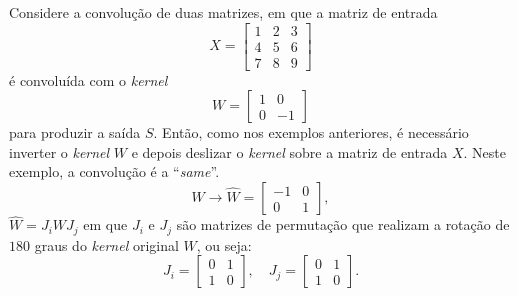 \begin{exemplo}
    \label{ex:conv2d}
    Considere a convolução de duas matrizes, em que a matriz de entrada 
    $$
    X = \begin{bmatrix}1 & 2 & 3 \\
            4 & 5 & 6 \\
            7 & 8 & 9 
        \end{bmatrix}
    $$ 
    é convoluída com o \textit{kernel} 
    $$
    W = \begin{bmatrix}1 & 0 \\
            0 & -1 
        \end{bmatrix}
    $$
    para produzir a saída $S$. Então, como nos exemplos anteriores, é necessário inverter o \textit{kernel} $W$ e depois deslizar o \textit{kernel} sobre a matriz de entrada $X$. Neste exemplo, a convolução é a ``\textit{same}''.
    $$
    W \to \hat{W} = \begin{bmatrix}-1 & 0 \\
            0 & 1 
        \end{bmatrix},
    $$
$\hat{W} = J_iWJ_j$ em que $J_i$ e $J_j$ são matrizes de permutação que realizam a rotação de $180$ graus do \textit{kernel} original $W$, ou seja:
$$
J_i = \begin{bmatrix}
    0 & 1 \\
    1 & 0 
\end{bmatrix}, 
\quad J_j = \begin{bmatrix}
    0 & 1 \\
    1 & 0 
\end{bmatrix}.
$$


\end{exemplo}
